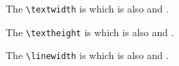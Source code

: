 \documentclass[12pt]{article}
\begin{document}
The \verb|\textwidth| is \printlength{\textwidth} which is also
\printlength{\textwidth} and
\printlength{\textwidth}.

The \verb|\textheight| is \printlength{\textheight} which is also
\printlength{\textheight} and
\printlength{\textheight}.

The \verb|\linewidth| is \printlength{\linewidth} which is also
\printlength{\linewidth} and
\printlength{\linewidth}.
\end{document}

